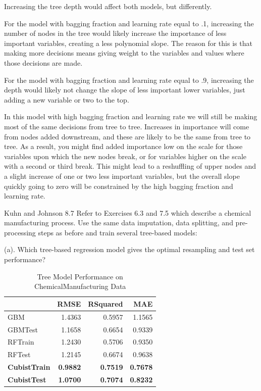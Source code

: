 \documentclass[]{report}
\begin{document}
Increasing the tree depth would affect both models, but differently.

For the model with bagging fraction and learning rate equal to .1,
increasing the number of nodes in the tree would likely increase the
importance of less important variables, creating a less polynomial
slope. The reason for this is that making more decisions means giving
weight to the variables and values where those decisions are made.

For the model with bagging fraction and learning rate equal to .9,
increasing the depth would likely not change the slope of less important
lower variables, just adding a new variable or two to the top.

In this model with high bagging fraction and learning rate we will still
be making most of the same decisions from tree to tree. Increases in
importance will come from nodes added downstream, and these are likely
to be the same from tree to tree. As a result, you might find added
importance low on the scale for those variables upon which the new nodes
break, or for variables higher on the scale with a second or third
break. This might lead to a reshuffling of upper nodes and a slight
increase of one or two less important variables, but the overall slope
quickly going to zero will be constrained by the high bagging fraction
and learning rate.


\begin{question}{Kuhn and Johnson 8.7}
Refer to Exercises 6.3 and 7.5 which describe a chemical manufacturing process. Use the same data imputation, data splitting, and pre-processing steps as before and train several tree-based models:
\end{question}

\begin{subquestion}{(a).} Which tree-based regression model gives the optimal resampling and test set performance? \end{subquestion}

\begin{table}[H]

\caption{\label{tab:unnamed-chunk-1}Tree Model Performance on ChemicalManufacturing Data}
\centering
\fontsize{8}{10}\selectfont
\begin{tabular}[t]{l|r|r|r}
\hline
\textbf{ } & \textbf{RMSE} & \textbf{RSquared} & \textbf{MAE}\\
\hline
\rowcolor{gray!6}  GBM & 1.4363 & 0.5957 & 1.1565\\
\hline
GBMTest & 1.1658 & 0.6654 & 0.9339\\
\hline
\rowcolor{gray!6}  RFTrain & 1.2430 & 0.5706 & 0.9350\\
\hline
RFTest & 1.2145 & 0.6674 & 0.9638\\
\hline
\rowcolor{gray!6}  \rowcolor[HTML]{d9f2e6}  \textbf{CubistTrain} & \textbf{0.9882} & \textbf{0.7519} & \textbf{0.7678}\\
\hline
\rowcolor[HTML]{d9f2e6}  \textbf{CubistTest} & \textbf{1.0700} & \textbf{0.7074} & \textbf{0.8232}\\
\hline
\end{tabular}
\end{table}
\end{document}
